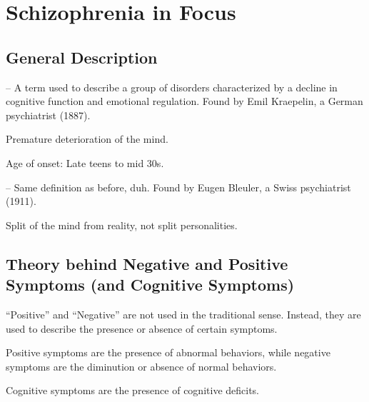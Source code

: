 \section{Schizophrenia in Focus}

\subsection{General Description}

\begin{coloredlist}
    \item {} -- A term used to describe a group of disorders characterized by a decline in cognitive function and emotional regulation. Found by Emil Kraepelin, a German psychiatrist (1887).
    \begin{coloredlist}
        \item Premature deterioration of the mind.
    \end{coloredlist}
    \item Age of onset: Late teens to mid 30s.
    \item {} -- Same definition as before, duh. Found by Eugen Bleuler, a Swiss psychiatrist (1911).
    \begin{coloredlist}
        \item Split of the mind from reality, not split personalities.
    \end{coloredlist}
\end{coloredlist}

\subsection{Theory behind Negative and Positive Symptoms (and Cognitive Symptoms)}

\begin{coloredlist}
    \item ``Positive'' and ``Negative'' are not used in the traditional sense. Instead, they are used to describe the presence or absence of certain symptoms.
    \begin{coloredlist}
        \item Positive symptoms are the presence of abnormal behaviors, while negative symptoms are the diminution or absence of normal behaviors.
        \item Cognitive symptoms are the presence of cognitive deficits.
    \end{coloredlist}
\end{coloredlist}

